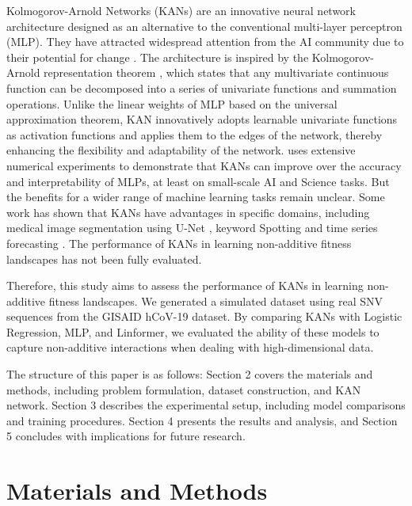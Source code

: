 \documentclass{article}
\begin{document}
Kolmogorov-Arnold Networks (KANs) are an innovative neural network architecture designed as an alternative to  the conventional multi-layer perceptron (MLP). They have attracted widespread attention from the AI community due to their potential for change \parencite{vaca2024kolmogorov}. The architecture is inspired by the Kolmogorov-Arnold representation theorem \parencite{kolmogorov1961representation, kolmogorov1957representation, braun2009constructive}, which states that any multivariate continuous function can be decomposed into a series of univariate functions and summation operations. Unlike the linear weights of MLP based on the universal approximation theorem, KAN innovatively adopts learnable univariate functions as activation functions and applies them to the edges of the network, thereby enhancing the flexibility and adaptability of the network. \textcite{liu2024kankolmogorovarnoldnetworks} uses extensive numerical experiments to demonstrate that KANs can improve over the accuracy and interpretability of MLPs, at least on small-scale AI and Science tasks. But the benefits for a wider range of machine learning tasks remain unclear. Some work has shown that KANs have advantages in specific domains, including medical image segmentation using U-Net \parencite{li2024u}, keyword Spotting \parencite{xu2024effective} and time series forecasting \parencite{vaca2024kolmogorov}. The performance of KANs in learning non-additive fitness landscapes has not been fully evaluated.


Therefore, this study aims to assess the performance  of KANs in learning non-additive fitness landscapes. We generated a simulated dataset using real SNV sequences from the GISAID hCoV-19 dataset. By comparing KANs with Logistic Regression, MLP, and Linformer, we evaluated the ability of these models to capture non-additive interactions when dealing with high-dimensional data.


The structure of this paper is as follows: Section 2 covers the materials and methods, including problem formulation, dataset construction, and KAN network. Section 3 describes the experimental setup, including model comparisons and training procedures. Section 4 presents the results and analysis, and Section 5 concludes with implications for future research.

\section{Materials and Methods}
\end{document}
